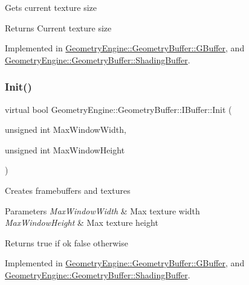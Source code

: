 Gets current texture size \begin{DoxyReturn}{Returns}
Current texture size 
\end{DoxyReturn}


Implemented in \mbox{\hyperlink{class_geometry_engine_1_1_geometry_buffer_1_1_g_buffer_a2b829115597fc587cd6f4ddb52b875cc}{Geometry\+Engine\+::\+Geometry\+Buffer\+::\+G\+Buffer}}, and \mbox{\hyperlink{class_geometry_engine_1_1_geometry_buffer_1_1_shading_buffer_aae6f448abdadd4ef47b7b19984fc3831}{Geometry\+Engine\+::\+Geometry\+Buffer\+::\+Shading\+Buffer}}.

\mbox{\label{class_geometry_engine_1_1_geometry_buffer_1_1_i_buffer_ace4f0f514bf5a96790fbfffe515dcc0b}} 
\subsubsection{\texorpdfstring{Init()}{Init()}}
{\footnotesize\ttfamily virtual bool Geometry\+Engine\+::\+Geometry\+Buffer\+::\+I\+Buffer\+::\+Init (\begin{DoxyParamCaption}\item[{unsigned int}]{Max\+Window\+Width,  }\item[{unsigned int}]{Max\+Window\+Height }\end{DoxyParamCaption})\hspace{0.3cm}{\ttfamily [pure virtual]}}

Creates framebuffers and textures 
\begin{DoxyParams}{Parameters}
{\em Max\+Window\+Width} & Max texture width \\
\hline
{\em Max\+Window\+Height} & Max texture height \\
\hline
\end{DoxyParams}
\begin{DoxyReturn}{Returns}
true if ok false otherwise 
\end{DoxyReturn}


Implemented in \mbox{\hyperlink{class_geometry_engine_1_1_geometry_buffer_1_1_g_buffer_ad4d5684575aa5819a91097a1b6a0e8df}{Geometry\+Engine\+::\+Geometry\+Buffer\+::\+G\+Buffer}}, and \mbox{\hyperlink{class_geometry_engine_1_1_geometry_buffer_1_1_shading_buffer_af1fdd3ca773dce41a4fbe4bec2df12fa}{Geometry\+Engine\+::\+Geometry\+Buffer\+::\+Shading\+Buffer}}.

